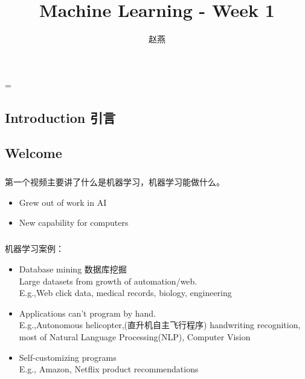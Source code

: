 \documentclass{article}
\title{Machine Learning - Week 1}
\author{赵燕}
\date{}
\begin{document}
 
\hfuzz=\maxdimen
{}
\begin{CJK}{UTF8}{gbsn} 
\maketitle
\renewcommand\contentsname{目录}
\renewcommand\figurename{图}
\tableofcontents
\newpage

\section{Introduction 引言}
\subsection{Welcome}
\subparagraph*{}
 第一个视频主要讲了什么是机器学习，机器学习能做什么。
\begin{itemize}
  \item Grew out of work in AI
  \item New capability for computers
\end{itemize}
\subparagraph*{}
 机器学习案例：
\begin{itemize}
  \item Database mining 数据库挖掘\\
   Large datasets from growth of automation/web.\\
   E.g.,Web click data, medical records, biology, engineering
  \item Applications can't program by hand.\\
   E.g.,Autonomous helicopter,(直升机自主飞行程序) handwriting recognition, most of Natural Language Processing(NLP), Computer Vision
  \item Self-customizing programs\\
   E.g., Amazon, Netflix product recommendations
\end{itemize}

\end{CJK}
\end{document}

